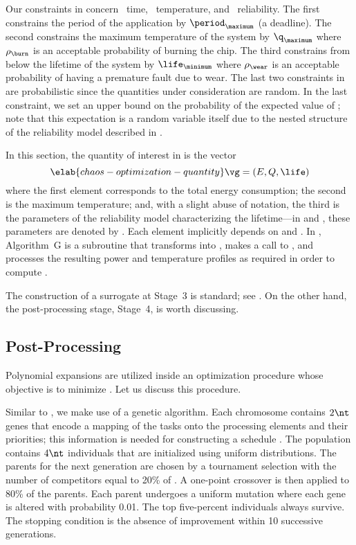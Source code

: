 Our constraints in  concern \one~time,
\two~temperature, and \three~reliability. The first constrains the period of the
application by $\period_\maximum$ (a deadline). The second constrains the
maximum temperature of the system by $\q_\maximum$ where $\rho_\burn$ is an
acceptable probability of burning the chip. The third constrains from below the
lifetime of the system by $\life_\minimum$ where $\rho_\wear$ is an acceptable
probability of having a premature fault due to wear. The last two constraints in
 are probabilistic since the quantities
under consideration are random. In the last constraint, we set an upper bound on
the probability of the expected value of \life; note that this expectation is a
random variable itself due to the nested structure of the reliability model
described in .

In this section, the quantity of interest \g in  is the
vector
\begin{equation} \elab{chaos-optimization-quantity}
  \vg = (E, Q, \life)
\end{equation}
where the first element corresponds to the total energy consumption; the second
is the maximum temperature; and, with a slight abuse of notation, the third is
the parameters of the reliability model characterizing the lifetime---in
 and , these
parameters are denoted by \vg. Each element implicitly depends on \schedule and
\vu. In , Algorithm~G is a subroutine that transforms
\vz into \vu, makes a call to , and
processes the resulting power and temperature profiles as required in order to
compute \vg.

The construction of a surrogate at Stage~3 is standard; see
. On the other hand, the post-processing stage,
Stage~4, is worth discussing.

\subsection{Post-Processing}

Polynomial expansions are utilized inside an optimization procedure whose
objective is to minimize . Let us discuss
this procedure.

Similar to , we make use of a genetic algorithm.
Each chromosome contains $2 \nt$ genes that encode a mapping of the tasks onto
the processing elements and their priorities; this information is needed for
constructing a schedule \schedule. The population contains $4 \nt$ individuals
that are initialized using uniform distributions. The parents for the next
generation are chosen by a tournament selection with the number of competitors
equal to 20\% of \nt. A one-point crossover is then applied to 80\% of the
parents. Each parent undergoes a uniform mutation where each gene is altered
with probability 0.01. The top five-percent individuals always survive. The
stopping condition is the absence of improvement within 10 successive
generations.

